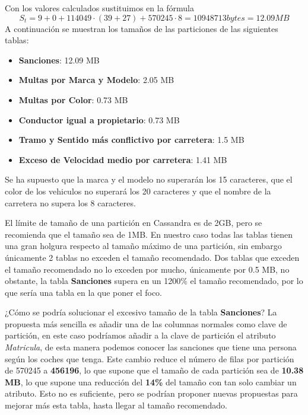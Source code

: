 \documentclass[]{article}
\begin{document}
Con los valores calculados sustituimos en la fórmula $$S_t = 9 + 0 + 114049 \cdot (39 + 27) + 570245 \cdot 8 = 10948713 bytes = 12.09 MB$$
A continuación se muestran los tamaños de las particiones de las siguientes tablas:
\begin{itemize}
    \item \textbf{Sanciones}: 12.09 MB
    \item \textbf{Multas por Marca y Modelo}: 2.05 MB
    \item \textbf{Multas por Color}: 0.73 MB
    \item \textbf{Conductor igual a propietario}: 0.73 MB
    \item \textbf{Tramo y Sentido más conflictivo por carretera}: 1.5 MB
    \item \textbf{Exceso de Velocidad medio por carretera}: 1.41 MB
\end{itemize}

Se ha supuesto que la marca y el modelo no superarán los 15 caracteres, que el color de los vehiculos no superará los 20 caracteres y que el nombre de la carretera no supera los 8 caracteres.



El límite de tamaño de una partición en Cassandra es de 2GB, pero se recomienda que el tamaño sea de 1MB. En nuestro caso todas las tablas tienen una gran holgura respecto al tamaño máximo de una partición, sin embargo únicamente 2 tablas no exceden el tamaño recomendado. Dos tablas que exceden el tamaño recomendado no lo exceden por mucho, únicamente por 0.5 MB, no obstante, la tabla \textbf{Sanciones} supera en un 1200\% el tamaño recomendado, por lo que sería una tabla en la que poner el foco.

¿Cómo se podría solucionar el excesivo tamaño de la tabla \textbf{Sanciones}? La propuesta más sencilla es añadir una de las columnas normales como clave de partición, en este caso podríamos añadir a la clave de partición el atributo \textit{Matricula}, de esta manera podemos conocer las sanciones que tiene una persona según los coches que tenga. Este cambio reduce el número de filas por partición de 570245 a \textbf{456196}, lo que supone que el tamaño de cada partición sea de \textbf{10.38 MB}, lo que supone una reducción del \textbf{14\%} del tamaño con tan solo cambiar un atributo.
Esto no es suficiente, pero se podrían proponer nuevas propuestas para mejorar más esta tabla, hasta llegar al tamaño recomendado. 
\end{document}
